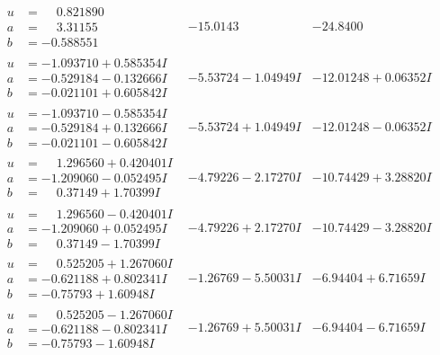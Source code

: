 \documentclass[1p]{elsarticle_modified}
\theoremstyle{definition}
\begin{document}
$$\begin{array}{c|c|c}
\begin{aligned}
u &= \phantom{-}0.821890\phantom{ +0.000000I} \\
a &= \phantom{-}3.31155\phantom{ +0.000000I} \\
b &= -0.588551\phantom{ +0.000000I}\end{aligned}
 & -15.0143\phantom{ +0.000000I} & -24.8400\phantom{ +0.000000I} \\ \hline\begin{aligned}
u &= -1.093710 + 0.585354 I \\
a &= -0.529184 - 0.132666 I \\
b &= -0.021101 + 0.605842 I\end{aligned}
 & -5.53724 - 1.04949 I & -12.01248 + 0.06352 I \\ \hline\begin{aligned}
u &= -1.093710 - 0.585354 I \\
a &= -0.529184 + 0.132666 I \\
b &= -0.021101 - 0.605842 I\end{aligned}
 & -5.53724 + 1.04949 I & -12.01248 - 0.06352 I \\ \hline\begin{aligned}
u &= \phantom{-}1.296560 + 0.420401 I \\
a &= -1.209060 - 0.052495 I \\
b &= \phantom{-}0.37149 + 1.70399 I\end{aligned}
 & -4.79226 - 2.17270 I & -10.74429 + 3.28820 I \\ \hline\begin{aligned}
u &= \phantom{-}1.296560 - 0.420401 I \\
a &= -1.209060 + 0.052495 I \\
b &= \phantom{-}0.37149 - 1.70399 I\end{aligned}
 & -4.79226 + 2.17270 I & -10.74429 - 3.28820 I \\ \hline\begin{aligned}
u &= \phantom{-}0.525205 + 1.267060 I \\
a &= -0.621188 + 0.802341 I \\
b &= -0.75793 + 1.60948 I\end{aligned}
 & -1.26769 - 5.50031 I & -6.94404 + 6.71659 I \\ \hline\begin{aligned}
u &= \phantom{-}0.525205 - 1.267060 I \\
a &= -0.621188 - 0.802341 I \\
b &= -0.75793 - 1.60948 I\end{aligned}
 & -1.26769 + 5.50031 I & -6.94404 - 6.71659 I \\ \hline\begin{aligned}

\end{aligned}
\end{array}$$
\end{document}
